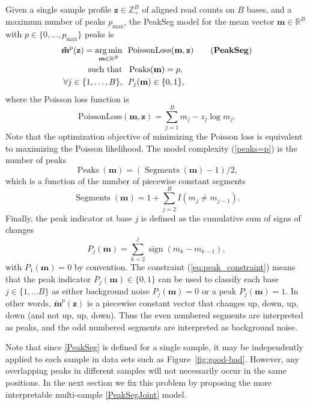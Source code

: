 \documentclass{article} %
\DeclareMathOperator*{\argmin}{arg\,min}
\DeclareMathOperator*{\Peaks}{Peaks}
\DeclareMathOperator*{\Segments}{Segments}
\newcommand{\sign}{\operatorname{sign}}
\newcommand{\RR}{\mathbb R}
\newcommand{\ZZ}{\mathbb Z}
\begin{document}
Given a single sample profile $\mathbf z\in\ZZ_+^B$ of aligned read counts
on $B$ bases, and a maximum number of peaks $p_{\text{max}}$, the
PeakSeg model for the mean vector $\mathbf m\in\RR^B$ with $p\in\{0,
\dots, p_{\text{max}}\}$ peaks is
\begin{align}
  \label{PeakSeg}
  \mathbf{\tilde m}^p(\mathbf z)  =
    \argmin_{\mathbf m\in\RR^{B}} &\ \ 
    \text{PoissonLoss}(\mathbf m, \mathbf z) 
    \tag{\textbf{PeakSeg}}
\\
    \text{such that} &\ \  \Peaks(\mathbf m)=p, \label{peaks=p} \\
     \forall j\in\{1, \dots, B\}, &\ \ P_j(\mathbf m) \in\{0, 1\},
    \label{eq:peak_constraint}
\end{align}
where the Poisson loss function is
\begin{equation}\label{eq:rho}
  \text{PoissonLoss}(\mathbf m, \mathbf z)= \sum_{j=1}^B m_j - z_j \log m_j.
\end{equation} 
Note that the optimization objective of minimizing the Poisson loss is
equivalent to maximizing the Poisson likelihood. The model complexity
(\ref{peaks=p}) is the number of peaks
\begin{equation}
  \Peaks(\mathbf m)=(\Segments(\mathbf m)-1)/2,
\end{equation}
which is a function of the number of piecewise constant segments
\begin{equation}
  \Segments(\mathbf m)=1+\sum_{j=2}^B I(m_j \neq m_{j-1}).
\end{equation}
Finally, the peak indicator at base $j$ is defined as the cumulative sum of
signs of changes
\begin{equation}
  \label{eq:peaks}
  P_j(\mathbf m) = \sum_{k=2}^j \sign( m_{k} - m_{k-1} ),
\end{equation}
with $P_1(\mathbf m)=0$ by convention. The constraint
(\ref{eq:peak_constraint}) means that the peak indicator $P_j(\mathbf
m)\in\{0, 1\}$ can be used to classify each base $j\in\{1,\dots B\}$
as either background noise $P_j(\mathbf m)=0$ or a peak $P_j(\mathbf
m)=1$.  In other words, $\mathbf{\tilde m}^p(\mathbf z)$ is a
piecewise constant vector that changes up, down, up, down (and not up,
up, down). Thus the even numbered segments are interpreted as peaks,
and the odd numbered segments are interpreted as background noise.

Note that since \ref{PeakSeg} is defined for a single sample, it may
be independently applied to each sample in data sets such as
Figure~\ref{fig:good-bad}. However, any overlapping peaks in different
samples will not necessarily occur in the same positions. In the next
section we fix this problem by proposing the more interpretable
multi-sample \ref{PeakSegJoint} model.
\end{document}
